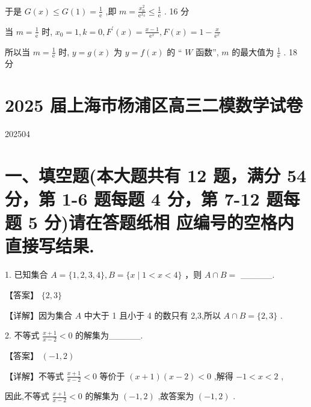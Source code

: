 \documentclass[10pt]{article}
\begin{document}
于是 \(G\left( x\right)  \leq  G\left( 1\right)  = \frac{1}{\mathrm{e}}\) ,即 \(m = \frac{{x}_{0}^{2}}{{\mathrm{e}}^{{x}_{0}}} \leq  \frac{1}{\mathrm{e}}\) . 16 分

当 \(m = \frac{1}{\mathrm{e}}\) 时, \({x}_{0} = 1,k = 0,{F}^{\prime }\left( x\right)  = \frac{x - 1}{{\mathrm{e}}^{x}},F\left( x\right)  = 1 - \frac{x}{{\mathrm{e}}^{x}}\)

\begin{center}
\end{center}

所以当 \(m = \frac{1}{\mathrm{e}}\) 时, \(y = g\left( x\right)\) 为 \(y = f\left( x\right)\) 的 “ \(W\) 函数”, \(m\) 的最大值为 \(\frac{1}{\mathrm{e}}\) . 18 分

\section*{2025 届上海市杨浦区高三二模数学试卷}

202504

\section*{一、填空题(本大题共有 12 题，满分 54 分，第 1-6 题每题 4 分，第 7-12 题每题 5 分)请在答题纸相 应编号的空格内直接写结果.}

1. 已知集合 \(A = \{ 1,2,3,4\} ,B = \{ x \mid  1 < x < 4\}\) ，则 \(A \cap  B =\) \_\_\_\_\_.

【答案】 \(\{ 2,3\}\)

【详解】因为集合 \(A\) 中大于 1 且小于 4 的数只有 2,3,所以 \(A \cap  B = \{ 2,3\}\) .

2. 不等式 \(\frac{x + 1}{x - 2} < 0\) 的解集为\_\_\_\_\_.

【答案】 \(\left( {-1,2}\right)\)

【详解】不等式 \(\frac{x + 1}{x - 2} < 0\) 等价于 \(\left( {x + 1}\right) \left( {x - 2}\right)  < 0\) ,解得 \(- 1 < x < 2\) ,

因此,不等式 \(\frac{x + 1}{x - 2} < 0\) 的解集为 \(\left( {-1,2}\right)\) ,故答案为 \(\left( {-1,2}\right)\) .
\end{document}
